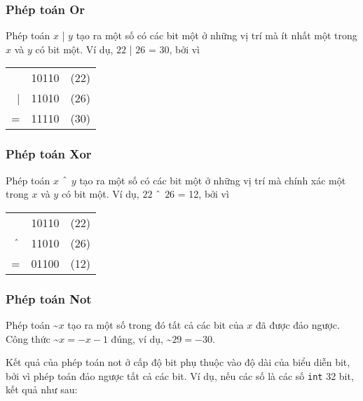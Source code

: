 \subsubsection{Phép toán Or}


Phép toán  $x$ | $y$ tạo ra một số
có các bit một ở những vị trí mà ít nhất một trong
$x$ và $y$ có bit một.
Ví dụ, $22$ | $26$ = 30, bởi vì

\begin{center}
\begin{tabular}{rrr}
& 10110 & (22)\\
| & 11010 & (26) \\
\hline
 = & 11110 & (30) \\
\end{tabular}
\end{center}

\subsubsection{Phép toán Xor}


Phép toán  $x$ $\XOR$ $y$ tạo ra một số
có các bit một ở những vị trí mà chính xác một trong
$x$ và $y$ có bit một.
Ví dụ, $22$ $\XOR$ $26$ = 12, bởi vì

\begin{center}
\begin{tabular}{rrr}
& 10110 & (22)\\
$\XOR$ & 11010 & (26) \\
\hline
 = & 01100 & (12) \\
\end{tabular}
\end{center}

\subsubsection{Phép toán Not}


Phép toán  \textasciitilde$x$
tạo ra một số trong đó tất cả các bit của $x$
đã được đảo ngược.
Công thức \textasciitilde$x = -x-1$ đúng,
ví dụ, \textasciitilde$29 = -30$.

Kết quả của phép toán not ở cấp độ bit
phụ thuộc vào độ dài của biểu diễn bit,
bởi vì phép toán đảo ngược tất cả các bit.
Ví dụ, nếu các số là các số
\texttt{int} 32 bit, kết quả như sau:

